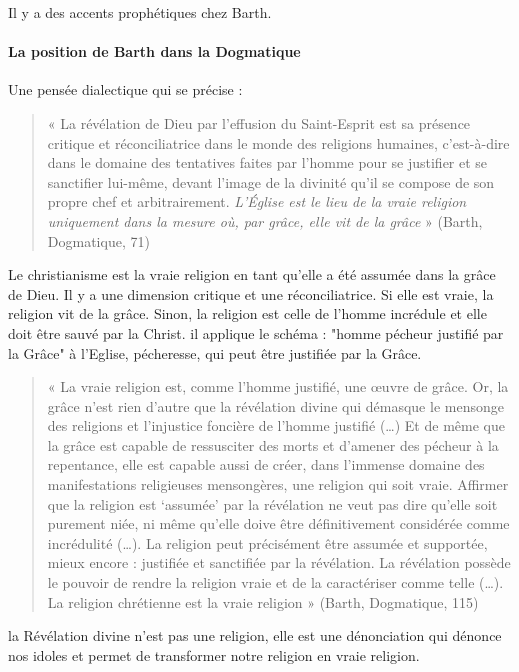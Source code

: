 Il y a des accents prophétiques chez Barth.


\paragraph{La position de Barth dans la Dogmatique}

Une pensée dialectique qui se précise : 
\begin{quote}
    «  La  révélation  de  Dieu  par  l’effusion  du  Saint-Esprit  est  sa  présence  critique  et  réconciliatrice  dans  le monde  des  religions  humaines,  c’est-à-dire  dans  le  domaine  des  tentatives  faites  par  l’homme  pour  se justifier  et  se  sanctifier  lui-même,  devant  l’image  de  la  divinité  qu’il  se  compose  de  son  propre  chef  et arbitrairement.  \textit{L’Église  est  le  lieu  de  la  vraie  religion  uniquement  dans  la  mesure  où,  par  grâce,  elle vit  de  la  grâce}  »  (Barth,  Dogmatique,  71)
\end{quote}
Le christianisme est la vraie religion en tant qu'elle a été assumée dans la grâce de Dieu. Il y a une dimension critique et une réconciliatrice. Si elle est vraie, la religion vit de la grâce. Sinon, la religion est celle de l'homme incrédule et elle doit être sauvé par la Christ. 
il applique le schéma : "homme pécheur justifié par la Grâce" à l'Eglise, pécheresse, qui peut être justifiée par la Grâce.

\begin{quote}
    «  La  vraie  religion  est,  comme  l’homme  justifié,  une  œuvre  de  grâce.  Or,  la  grâce  n’est  rien  d’autre que  la  révélation  divine  qui  démasque  le  mensonge  des  religions  et  l’injustice  foncière  de  l’homme justifié  (…)  Et  de  même  que  la  grâce  est  capable  de  ressusciter  des  morts  et  d’amener  des  pécheur  à  la repentance,  elle  est  capable  aussi  de  créer,  dans  l’immense  domaine  des  manifestations  religieuses mensongères,  une  religion  qui  soit  vraie.  Affirmer  que  la  religion  est  ‘assumée’  par  la  révélation  ne veut  pas  dire  qu’elle  soit  purement  niée,  ni  même  qu’elle  doive  être  définitivement  considérée  comme incrédulité  (…).  La  religion  peut  précisément  être  assumée   et  supportée,  mieux  encore  :  justifiée  et sanctifiée  par  la  révélation.  La  révélation  possède  le  pouvoir  de  rendre  la  religion  vraie  et  de  la caractériser  comme  telle  (…).  La  religion  chrétienne  est  la  vraie  religion  »  (Barth,  Dogmatique,  115)
\end{quote}
la Révélation divine n'est pas une religion, elle est une dénonciation qui dénonce nos idoles et permet de transformer notre religion en vraie religion.

